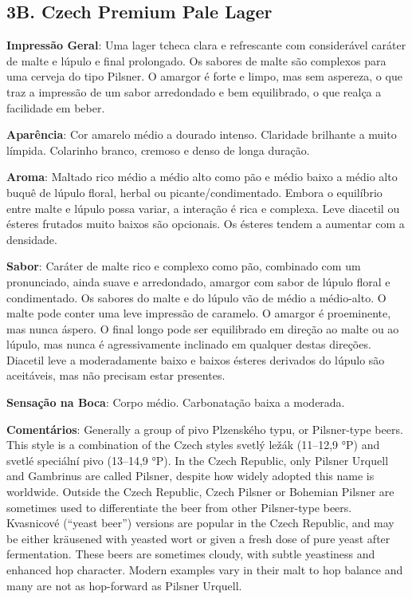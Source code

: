 \subsection*{3B. Czech Premium Pale Lager}

\textbf{Impressão Geral}: Uma lager tcheca clara e refrescante com considerável caráter de malte e lúpulo e final prolongado. Os sabores de malte são complexos para uma cerveja do tipo Pilsner. O amargor é forte e limpo, mas sem aspereza, o que traz a impressão de um sabor arredondado e bem equilibrado, o que realça a facilidade em beber.

\textbf{Aparência}: Cor amarelo médio a dourado intenso. Claridade brilhante a muito límpida. Colarinho branco, cremoso e denso de longa duração.

\textbf{Aroma}: Maltado rico médio a médio alto como pão e médio baixo a médio alto buquê de lúpulo floral, herbal ou picante/condimentado. Embora o equilíbrio entre malte e lúpulo possa variar, a interação é rica e complexa. Leve diacetil ou ésteres frutados muito baixos são opcionais. Os ésteres tendem a aumentar com a densidade.

\textbf{Sabor}: Caráter de malte rico e complexo como pão, combinado com um pronunciado, ainda suave e arredondado, amargor com sabor de lúpulo floral e condimentado. Os sabores do malte e do lúpulo vão de médio a médio-alto. O malte pode conter uma leve impressão de caramelo. O amargor é proeminente, mas nunca áspero. O final longo pode ser equilibrado em direção ao malte ou ao lúpulo, mas nunca é agressivamente inclinado em qualquer destas direções. Diacetil leve a moderadamente baixo e baixos ésteres derivados do lúpulo são aceitáveis, mas não precisam estar presentes.

\textbf{Sensação na Boca}: Corpo médio. Carbonatação baixa a moderada.

\textbf{Comentários}: Generally a group of pivo Plzenského typu, or Pilsner-type beers. This style is a combination of the Czech styles svetlý ležák (11–12,9 °P) and svetlé speciální pivo (13–14,9 °P). In the Czech Republic, only Pilsner Urquell and Gambrinus are called Pilsner, despite how widely adopted this name is worldwide. Outside the Czech Republic, Czech Pilsner or Bohemian Pilsner are sometimes used to differentiate the beer from other Pilsner-type beers. Kvasnicové (“yeast beer”) versions are popular in the Czech Republic, and may be either kräusened with yeasted wort or given a fresh dose of pure yeast after fermentation. These beers are sometimes cloudy, with subtle yeastiness and enhanced hop character. Modern examples vary in their malt to hop balance and many are not as hop-forward as Pilsner Urquell.

